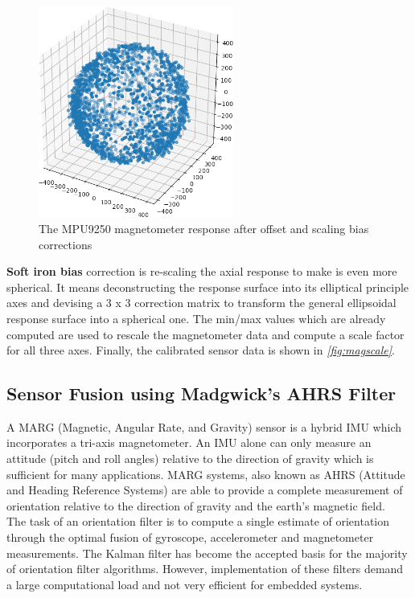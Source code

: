 \documentclass[a4paper,12pt,oneside]{book}
\begin{document}
\begin{figure}[!htb]
\centering
\includegraphics[width=0.57\textwidth]{images/scaled}
\caption{The MPU9250 magnetometer response after offset and scaling bias corrections}
\label{fig:magscale}
\end{figure}

\clearpage
\textbf{Soft iron bias} correction is re-scaling the axial response to make is even more spherical. It means deconstructing the response surface into its elliptical principle axes and devising a 3 x 3 correction matrix to transform the general ellipsoidal response surface into a spherical one. The min/max values which are already computed are used to rescale the magnetometer data and compute a scale factor for all three axes. Finally, the calibrated sensor data is shown in \textit{\autoref{fig:magscale}}.\cite{kris}\\

\subsection{Sensor Fusion using Madgwick's AHRS Filter}
A MARG (Magnetic, Angular Rate, and Gravity) sensor is a hybrid IMU which incorporates a tri-axis magnetometer. An IMU alone can only measure an attitude (pitch and roll angles) relative to the direction of gravity which is sufficient for many applications. MARG systems, also known as AHRS (Attitude and Heading Reference Systems) are able to provide a complete measurement of orientation relative to the direction of gravity and the earth's magnetic field.\cite{madgwick}\\

The task of an orientation filter is to compute a single estimate of orientation through the optimal fusion of gyroscope, accelerometer and magnetometer measurements. The Kalman filter has become the accepted basis for the majority of orientation filter algorithms. However, implementation of these filters demand a large computational load and not very efficient for embedded systems.\cite{madgwick}\\
\end{document}
